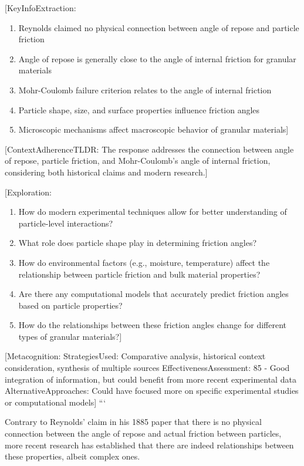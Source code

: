 \documentclass[xcolor=dvipsnames,10pt,hidelinks]{article}
\begin{document}
\begin{itemize}
{[}KeyInfoExtraction:
\begin{enumerate}
\item Reynolds claimed no physical connection between angle of repose and particle friction
\item Angle of repose is generally close to the angle of internal friction for granular materials
\item Mohr-Coulomb failure criterion relates to the angle of internal friction
\item Particle shape, size, and surface properties influence friction angles
\item Microscopic mechanisms affect macroscopic behavior of granular materials]
\end{enumerate}

{[}ContextAdherenceTLDR: The response addresses the connection between angle of repose, particle friction, and Mohr-Coulomb's angle of internal friction, considering both historical claims and modern research.]

{[}Exploration:
\begin{enumerate}
\item How do modern experimental techniques allow for better understanding of particle-level interactions?
\item What role does particle shape play in determining friction angles?
\item How do environmental factors (e.g., moisture, temperature) affect the relationship between particle friction and bulk material properties?
\item Are there any computational models that accurately predict friction angles based on particle properties?
\item How do the relationships between these friction angles change for different types of granular materials?]
\end{enumerate}

{[}Metacognition:
StrategiesUsed: Comparative analysis, historical context consideration, synthesis of multiple sources
EffectivenessAssessment: 85 - Good integration of information, but could benefit from more recent experimental data
AlternativeApproaches: Could have focused more on specific experimental studies or computational models]
```

Contrary to Reynolds' claim in his 1885 paper that there is no physical connection between the angle of repose and actual friction between particles, more recent research has established that there are indeed relationships between these properties, albeit complex ones.


\end{itemize}
\end{document}
